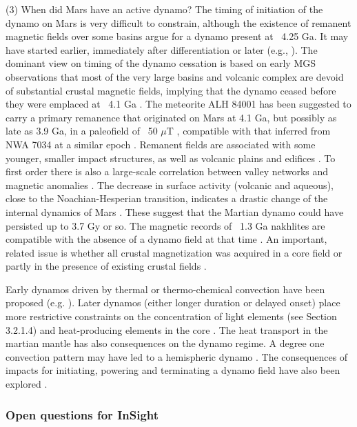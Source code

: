 (3)	When did Mars have an active dynamo?  The timing of initiation of the dynamo on Mars is very difficult to constrain, although the existence of remanent magnetic fields over some basins argue for a dynamo present at ~4.25 Ga. It may have started earlier, immediately after differentiation or later (e.g., \citet{Breuer2010}). The dominant view on timing of the dynamo cessation is based on early MGS observations that most of the very large basins and volcanic complex are devoid of substantial crustal magnetic fields, implying that the dynamo ceased before they were emplaced at ~4.1 Ga \citep{Acuna1999, Frey2008, Robbins2013}. The meteorite ALH 84001 has been suggested to carry a primary remanence that originated on Mars at 4.1 Ga, but possibly as late as 3.9 Ga, in a paleofield of ~50 $\mu$T \citep{Weiss2002, Weiss82004, Weiss2008}, compatible with that inferred from NWA 7034 at a similar epoch \citep{Gattacceca2014}. Remanent fields are associated with some younger, smaller impact structures, as well as volcanic plains and edifices \citep{Langlais2007,Milbury2012a}. To first order there is also a large-scale correlation between valley networks and magnetic anomalies \citep{Hood2010}. The decrease in surface activity (volcanic and aqueous), close to the Noachian-Hesperian transition, indicates a drastic change of the internal dynamics of Mars \citep{Baratoux2013, Mangold2016}. These suggest that the Martian dynamo could have persisted up to 3.7 Gy or so. The magnetic records of ~1.3 Ga nakhlites are compatible with the absence of a dynamo field at that time \citep{Gattacceca2004, Funaki2009}. An important, related issue is whether all crustal magnetization was acquired in a core field or partly in the presence of existing crustal fields \citep{Gattacceca2004}.

Early dynamos driven by thermal or thermo-chemical convection have been proposed (e.g. \citet{Stevenson2001, Lillis2008, Stanley2008}).  Later dynamos (either longer duration or delayed onset) place more restrictive constraints on the concentration of light elements (see Section 3.2.1.4) and heat-producing elements in the core \citep{Schubert2000}. The heat transport in the martian mantle has also consequences on the dynamo regime. A degree one convection pattern may have led to a hemispheric dynamo \citep{Amit2011, Dietrich2013}.  The consequences of impacts for initiating, powering and terminating a dynamo field have also been explored \citep{Kuang2008, Roberts2009, Monteux2015}.

\subsubsection{Open questions for InSight}

